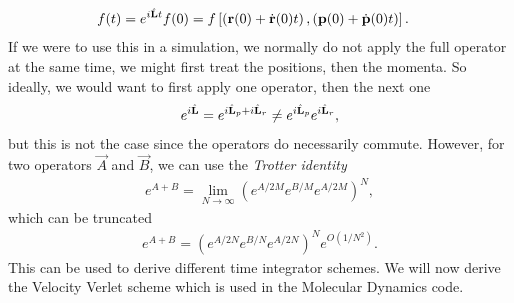 \begin{align}
	f(t) &= e^{i\hat{\mathbf L} t}f(0) = f\left[\left(\mathbf r(0) + \dot{\mathbf r}(0)t\right), \left(\mathbf p(0) + \dot{\mathbf p}(0)t\right)\right].
\end{align}
If we were to use this in a simulation, we normally do not apply the full operator at the same time, we might first treat the positions, then the momenta. So ideally, we would want to first apply one operator, then the next one
\begin{align}
	e^{i\hat{\mathbf L}} = e^{i\hat{\mathbf L}_p + i\hat{\mathbf L}_r} \neq e^{i\hat{\mathbf L}_p}e^{i\hat{\mathbf L}_r},
\end{align}
but this is not the case since the operators do necessarily commute. However, for two operators $\vec A$ and $\vec B$, we can use the \textit{Trotter identity}\cite{frenkel2001understanding}
\begin{align}
	e^{A + B} = \lim_{N\rightarrow\infty}\left(e^{A/2M}e^{B/M}e^{A/2M}\right)^N,
\end{align}
which can be truncated
\begin{align}
	e^{A + B} = \left(e^{A/2N}e^{B/N}e^{A/2N}\right)^Ne^{O(1/N^2)}.
\end{align}
This can be used to derive different time integrator schemes. We will now derive the Velocity Verlet scheme which is used in the Molecular Dynamics code.
